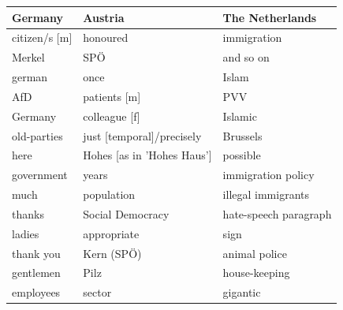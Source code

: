 \documentclass{article}
\begin{document}
\begin{table}[ht!]
\centering
\begin{tabular}{|l|l|l|}
\hline
\textbf{Germany}                         & \textbf{Austria}            & \textbf{The Netherlands} \\ \hline
\rowcolor[HTML]{c41200} 
citizen/s {[}m{]}                        & honoured                    & immigration              \\ \hline
\rowcolor[HTML]{c41200} 
Merkel                                   & SPÖ                         & and so on                \\ \hline
\rowcolor[HTML]{c41200} 
german                                   & once                        & Islam                    \\ \hline
\rowcolor[HTML]{c41200} 
AfD                                      & patients  {[}m{]}           & PVV                      \\ \hline
\rowcolor[HTML]{c41200} 
Germany                                  & colleague {[}f{]}           & Islamic                  \\ \hline
\rowcolor[HTML]{c41200} 
old-parties                              & just {[}temporal{]}/precisely & Brussels                 \\ \hline
\rowcolor[HTML]{c41200} 
here                                     & Hohes {[}as in 'Hohes Haus'{]} & possible                 \\ \hline
\rowcolor[HTML]{c41200} 
government                               & years                       & immigration policy       \\ \hline
\rowcolor[HTML]{c41200} 
much                                     & population                  & illegal immigrants       \\ \hline
\rowcolor[HTML]{c41200} 
thanks                                   & Social Democracy            & hate-speech paragraph    \\ \hline
\rowcolor[HTML]{c41200} 
ladies                                   & appropriate                 & sign                     \\ \hline
\rowcolor[HTML]{c41200} 
thank you                                & Kern (SPÖ)                  & animal police            \\ \hline
\rowcolor[HTML]{c41200} 
gentlemen                                & Pilz                        & house-keeping            \\ \hline
\rowcolor[HTML]{c41200} 
employees                                & sector                      & gigantic                 \\ \hline

\end{tabular}
\end{table}
\end{document}

